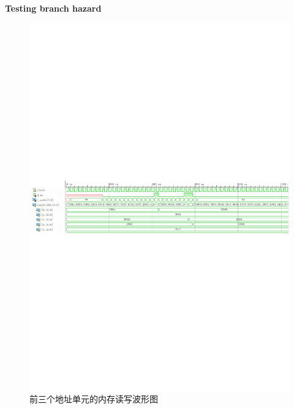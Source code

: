 \documentclass[10pt,a4paper,fleqn]{article}
\begin{document}
\par {\bf Testing branch hazard}
\begin{figure}[H]
  \centering
  \includegraphics[width=\textwidth]{figure/simu/branchmemwave.pdf}
  \caption{前三个地址单元的内存读写波形图}
  \label{Fig.memwave}
\end{figure}
\end{document}
